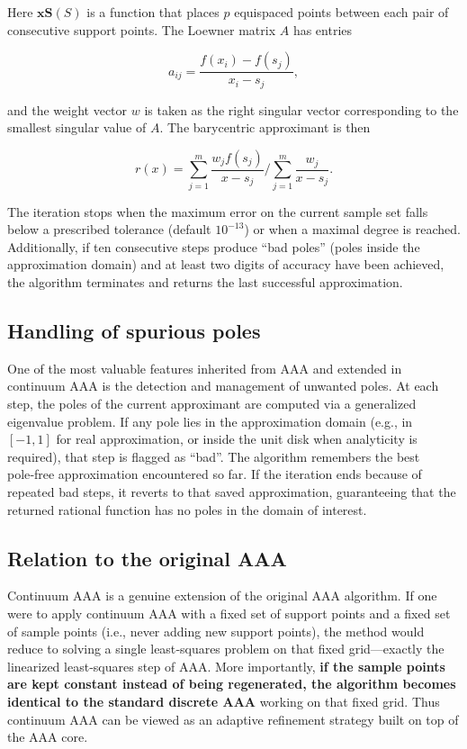 \documentclass{article}
\begin{document}
Here \(\mathbf{xS}(S)\) is a function that places \(p\) equispaced points between each pair of consecutive support points. The Loewner matrix \(A\) has entries

\[
a_{ij} = \frac{f(x_i)-f(s_j)}{x_i-s_j},
\]

and the weight vector \(w\) is taken as the right singular vector corresponding to the smallest singular value of \(A\). The barycentric approximant is then

\[
r(x) = \sum_{j=1}^{m}\frac{w_j f(s_j)}{x-s_j}\Bigg/\sum_{j=1}^{m}\frac{w_j}{x-s_j}.
\]

The iteration stops when the maximum error on the current sample set falls below a prescribed tolerance (default \(10^{-13}\)) or when a maximal degree is reached. Additionally, if ten consecutive steps produce ``bad poles'' (poles inside the approximation domain) and at least two digits of accuracy have been achieved, the algorithm terminates and returns the last successful approximation.

\subsection{Handling of spurious poles}

One of the most valuable features inherited from AAA and extended in continuum AAA is the detection and management of unwanted poles. At each step, the poles of the current approximant are computed via a generalized eigenvalue problem. If any pole lies in the approximation domain (e.g., in \([-1,1]\) for real approximation, or inside the unit disk when analyticity is required), that step is flagged as ``bad''. The algorithm remembers the best pole‑free approximation encountered so far. If the iteration ends because of repeated bad steps, it reverts to that saved approximation, guaranteeing that the returned rational function has no poles in the domain of interest.

\subsection{Relation to the original AAA}

Continuum AAA is a genuine extension of the original AAA algorithm. If one were to apply continuum AAA with a fixed set of support points and a fixed set of sample points (i.e., never adding new support points), the method would reduce to solving a single least‑squares problem on that fixed grid—exactly the linearized least‑squares step of AAA. More importantly, \textbf{if the sample points are kept constant instead of being regenerated, the algorithm becomes identical to the standard discrete AAA} working on that fixed grid. Thus continuum AAA can be viewed as an adaptive refinement strategy built on top of the AAA core.
\end{document}
